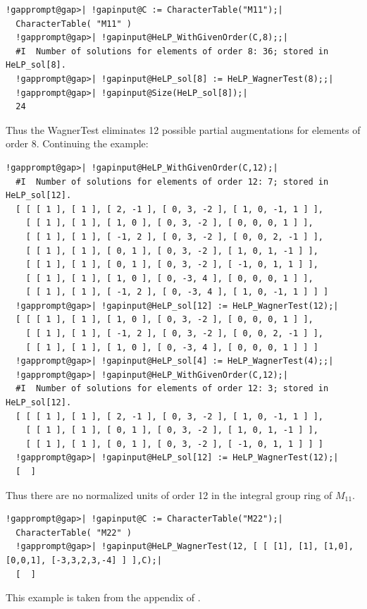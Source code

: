 \documentclass[a4paper,11pt]{report}
\begin{document}
{{ 
\begin{Verbatim}[commandchars=!@|,fontsize=\small,frame=single,label=Example]
  !gapprompt@gap>| !gapinput@C := CharacterTable("M11");|
  CharacterTable( "M11" )
  !gapprompt@gap>| !gapinput@HeLP_WithGivenOrder(C,8);;|
  #I  Number of solutions for elements of order 8: 36; stored in HeLP_sol[8].
  !gapprompt@gap>| !gapinput@HeLP_sol[8] := HeLP_WagnerTest(8);;|
  !gapprompt@gap>| !gapinput@Size(HeLP_sol[8]);|
  24
\end{Verbatim}
 Thus the Wagner\texttt{}Test eliminates 12 possible partial
augmentations for elements of order 8. Continuing the example: 
\begin{Verbatim}[commandchars=!@|,fontsize=\small,frame=single,label=Example]
  !gapprompt@gap>| !gapinput@HeLP_WithGivenOrder(C,12);|
  #I  Number of solutions for elements of order 12: 7; stored in HeLP_sol[12].
  [ [ [ 1 ], [ 1 ], [ 2, -1 ], [ 0, 3, -2 ], [ 1, 0, -1, 1 ] ], 
    [ [ 1 ], [ 1 ], [ 1, 0 ], [ 0, 3, -2 ], [ 0, 0, 0, 1 ] ], 
    [ [ 1 ], [ 1 ], [ -1, 2 ], [ 0, 3, -2 ], [ 0, 0, 2, -1 ] ], 
    [ [ 1 ], [ 1 ], [ 0, 1 ], [ 0, 3, -2 ], [ 1, 0, 1, -1 ] ], 
    [ [ 1 ], [ 1 ], [ 0, 1 ], [ 0, 3, -2 ], [ -1, 0, 1, 1 ] ], 
    [ [ 1 ], [ 1 ], [ 1, 0 ], [ 0, -3, 4 ], [ 0, 0, 0, 1 ] ], 
    [ [ 1 ], [ 1 ], [ -1, 2 ], [ 0, -3, 4 ], [ 1, 0, -1, 1 ] ] ]
  !gapprompt@gap>| !gapinput@HeLP_sol[12] := HeLP_WagnerTest(12);|
  [ [ [ 1 ], [ 1 ], [ 1, 0 ], [ 0, 3, -2 ], [ 0, 0, 0, 1 ] ], 
    [ [ 1 ], [ 1 ], [ -1, 2 ], [ 0, 3, -2 ], [ 0, 0, 2, -1 ] ], 
    [ [ 1 ], [ 1 ], [ 1, 0 ], [ 0, -3, 4 ], [ 0, 0, 0, 1 ] ] ]
  !gapprompt@gap>| !gapinput@HeLP_sol[4] := HeLP_WagnerTest(4);;|
  !gapprompt@gap>| !gapinput@HeLP_WithGivenOrder(C,12);|
  #I  Number of solutions for elements of order 12: 3; stored in HeLP_sol[12].
  [ [ [ 1 ], [ 1 ], [ 2, -1 ], [ 0, 3, -2 ], [ 1, 0, -1, 1 ] ], 
    [ [ 1 ], [ 1 ], [ 0, 1 ], [ 0, 3, -2 ], [ 1, 0, 1, -1 ] ], 
    [ [ 1 ], [ 1 ], [ 0, 1 ], [ 0, 3, -2 ], [ -1, 0, 1, 1 ] ] ]
  !gapprompt@gap>| !gapinput@HeLP_sol[12] := HeLP_WagnerTest(12);|
  [  ]
\end{Verbatim}
 Thus there are no normalized units of order 12 in the integral group ring of $M_{11}.$ 
\begin{Verbatim}[commandchars=!@|,fontsize=\small,frame=single,label=Example]
  !gapprompt@gap>| !gapinput@C := CharacterTable("M22");|
  CharacterTable( "M22" )
  !gapprompt@gap>| !gapinput@HeLP_WagnerTest(12, [ [ [1], [1], [1,0], [0,0,1], [-3,3,2,3,-4] ] ],C);|
  [  ]
\end{Verbatim}
 This example is taken from the appendix of \cite{KonovalovM22}.

}}
\end{document}
